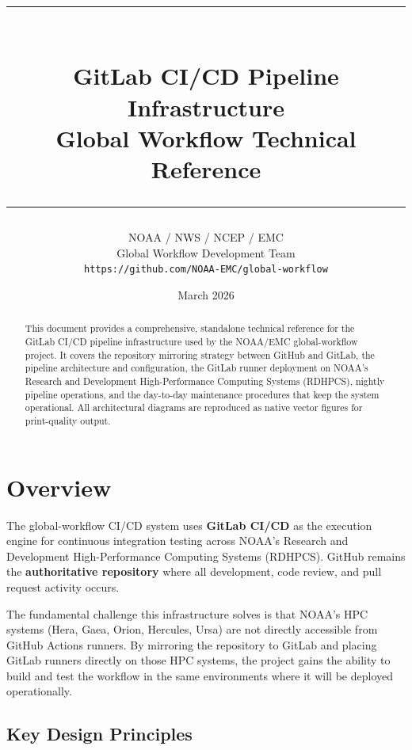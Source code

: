 \documentclass[11pt,letterpaper,twoside]{article}
\title{%
  \vspace{-0.5in}
  {\color{noaablue}\rule{\linewidth}{2pt}}\\[12pt]
  {\Huge\bfseries\color{noaadarkblue} GitLab CI/CD Pipeline\\[4pt] Infrastructure}\\[10pt]
  {\Large\color{heragray} Global Workflow Technical Reference}\\[12pt]
  {\color{noaablue}\rule{\linewidth}{2pt}}
}
\author{%
  NOAA / NWS / NCEP / EMC\\[2pt]
  {\normalsize Global Workflow Development Team}\\[2pt]
  {\small\texttt{https://github.com/NOAA-EMC/global-workflow}}
}
\date{March 2026}
\begin{document}
\maketitle
\thispagestyle{plain}

\begin{abstract}
\noindent
This document provides a comprehensive, standalone technical reference for the
GitLab CI/CD pipeline infrastructure used by the NOAA/EMC global-workflow
project. It covers the repository mirroring strategy between GitHub and GitLab,
the pipeline architecture and configuration, the GitLab runner deployment on
NOAA's Research and Development High-Performance Computing Systems (RDHPCS),
nightly pipeline operations, and the day-to-day maintenance procedures that
keep the system operational. All architectural diagrams are reproduced as
native vector figures for print-quality output.
\end{abstract}

\tableofcontents
\newpage

\section{Overview}
\label{sec:overview}

The global-workflow CI/CD system uses \textbf{GitLab CI/CD} as the execution
engine for continuous integration testing across NOAA's Research and Development
High-Performance Computing Systems (RDHPCS). GitHub remains the
\textbf{authoritative repository} where all development, code review, and pull
request activity occurs.

The fundamental challenge this infrastructure solves is that NOAA's HPC systems
(Hera, Gaea, Orion, Hercules, Ursa) are not directly accessible from GitHub
Actions runners. By mirroring the repository to GitLab and placing GitLab
runners directly on those HPC systems, the project gains the ability to build
and test the workflow in the same environments where it will be deployed
operationally.

\subsection{Key Design Principles}
\label{sec:design-principles}
\end{document}
